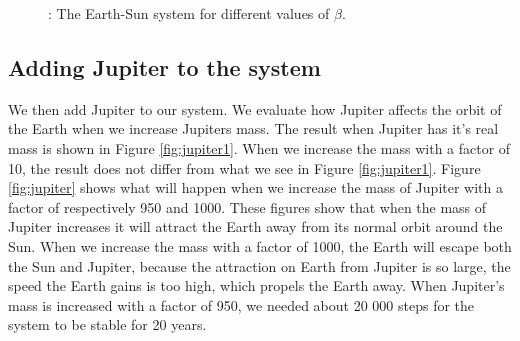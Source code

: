 \documentclass{article}
\begin{document}
        \begin{figure}[H]
            \caption{: The Earth-Sun system for different values of $\beta$.}
            \label{fig:beta}
        \end{figure}

    \subsection{Adding Jupiter to the system}
        We then add Jupiter to our system. We evaluate how Jupiter affects the orbit of the Earth when we increase Jupiters mass. The result when Jupiter has it's real mass is shown in Figure \ref{fig:jupiter1}. When we increase the mass with a factor of 10, the result does not differ from what we see in Figure \ref{fig:jupiter1}. Figure \ref{fig:jupiter} shows what will happen when we increase the mass of Jupiter with a factor of respectively 950 and 1000. These figures show that when the mass of Jupiter increases it will attract the Earth away from its normal orbit around the Sun. When we increase the mass with a factor of 1000, the Earth will escape both the Sun and Jupiter, because the attraction on Earth from Jupiter is so large, the speed the Earth gains is too high, which propels the Earth away. When Jupiter's mass is increased with a factor of 950, we needed about 20 000 steps for the system to be stable for 20 years.
\end{document}
